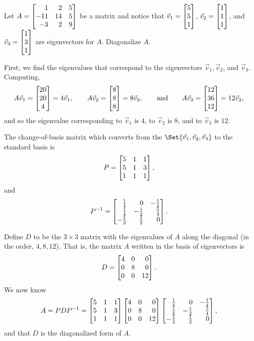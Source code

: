\begin{example}
	Let $A=\mat{1&2&5\\-11&14&5\\-3&2&9}$ be a matrix and notice that $\vec v_1=\mat{5\\5\\1}$, $\vec v_2=\mat{1\\1\\1}$,
	and $\vec v_3=\mat{1\\3\\1}$ are eigenvectors for $A$. Diagonalize $A$.

	First, we find the eigenvalues that correspond to the eigenvectors $\vec v_1, \vec v_2$, 
	and $\vec v_3$. Computing,
	\[
A\vec v_1=\matc{20\\20\\4}=4\vec v_1,\qquad A\vec v_2=\mat{8\\8\\8}=8\vec v_2,\qquad\text{and}\qquad
	A\vec v_3=\mat{12\\36\\12}=12\vec v_3, \]
	and so the eigenvalue corresponding to $\vec v_1$ is $4$, to $\vec v_2$ is $8$, 
	and to $\vec v_3$ is $12$.
	
	The change-of-basis matrix which converts from the $\Set{\vec v_1,\vec v_2,\vec v_3}$ to the standard basis is
	\[
		P = \mat{5&1&1\\5&1&3\\1&1&1},
	\]
	and
	\[
		P^{-1} = \mat{\frac{1}{4}&0&-\frac{1}{4}\\\frac{1}{4}&-\frac{1}{2}&\frac{5}{4}\\-\frac{1}{2}&\frac{1}{2}&0}.
	\]

	Define $D$ to be the $3\times 3$ matrix with the eigenvalues of $A$ along the diagonal (in the order, $4,8,12$). That is,
	the matrix $A$ written in the basis of eigenvectors is
	\[
		D = \mat{4&0&0\\0&8&0\\0&0&12}.
	\]
	We now know
	\[
		A = PDP^{-1}= \mat{5&1&1\\5&1&3\\1&1&1}\mat{4&0&0\\0&8&0\\0&0&12}
		\mat{\frac{1}{4}&0&-\frac{1}{4}\\\frac{1}{4}&-\frac{1}{2}&\frac{5}{4}\\-\frac{1}{2}&\frac{1}{2}&0},
	\]
	and that $D$ is the diagonalized form of $A$.
\end{example}

